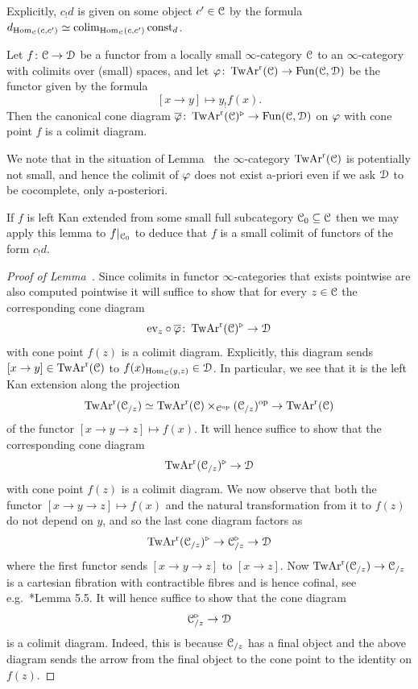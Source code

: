 Explicitly, $c_!d$ is given on some object $c' \in \mathcal C$ by the formula $d_{\operatorname{Hom}_\mathcal C(c,c')} \simeq \mathop{\mathrm{colim}}_{\operatorname{Hom}_\mathcal C(c,c')} \mathrm{const}_d$.

\begin{lemma}
\label{lemma:canonical-colimit}%
Let $f\colon \mathcal C \to \mathcal{D}$ be a functor from a locally small $\infty$-category $\mathcal C$ to an $\infty$-category with colimits over (small) spaces, and let $\varphi\colon \operatorname{TwAr}^{\mathrm{r}}(\mathcal C) \to \operatorname{Fun}(\mathcal C,\mathcal{D})$ be the functor given by the formula 
\[
[x \to y] \mapsto y_!f(x) .
\]
Then the canonical cone diagram $\overline{\varphi}\colon \operatorname{TwAr}^{\mathrm{r}}(\mathcal C)^{\triangleright} \to \operatorname{Fun}(\mathcal C,\mathcal{D})$ on $\varphi$ with cone point $f$ is a colimit diagram.
\end{lemma}

We note that in the situation of Lemma~ the $\infty$-category $\operatorname{TwAr}^{\mathrm{r}}(\mathcal C)$ is potentially not small, and hence the colimit of $\varphi$ does not exist a-priori even if we ask $\mathcal{D}$ to be cocomplete, only a-posteriori. 

\begin{remark}
\label{remark:canonical-colimit}%
If $f$ is left Kan extended from some small full subcategory $\mathcal C_0 \subseteq \mathcal C$ then we may apply this lemma to $f|_{\mathcal C_0}$ to deduce that $f$ is a small colimit of functors of the form $c_!d$.
\end{remark}

\begin{proof}[Proof of Lemma~]
Since colimits in functor $\infty$-categories that exists pointwise are also computed pointwise it will suffice to show that for every $z \in \mathcal C$ the corresponding cone diagram
\[
\mathrm{ev}_{z} \circ \overline{\varphi}\colon \operatorname{TwAr}^{\mathrm{r}}(\mathcal C)^{\triangleright} \to \mathcal{D}
\]
with cone point $f(z)$ is a colimit diagram. Explicitly, this diagram sends $[x \to y] \in \operatorname{TwAr}^{\mathrm{r}}(\mathcal C)$ to $f(x)_{\operatorname{Hom}_{\mathcal C}(y,z)} \in \mathcal{D}$. In particular, we see that it is the left Kan extension along the projection 
\[
\operatorname{TwAr}^{\mathrm{r}}(\mathcal C_{/z}) \simeq \operatorname{TwAr}^{\mathrm{r}}(\mathcal C) \times_{\mathcal C^\mathrm{op}} (\mathcal C_{/z})^\mathrm{op} \to \operatorname{TwAr}^{\mathrm{r}}(\mathcal C)
\]
of the functor $[x \to y \to z] \mapsto f(x)$. It will hence suffice to show that the corresponding cone diagram
\[
\operatorname{TwAr}^{\mathrm{r}}(\mathcal C_{/z})^{\triangleright} \to \mathcal{D}
\]
with cone point $f(z)$ is a colimit diagram. We now observe that both the functor $[x \to y \to z] \mapsto f(x)$ and the natural transformation from it to $f(z)$ do not depend on $y$, and so the last cone diagram factors as
\[
\operatorname{TwAr}^{\mathrm{r}}(\mathcal C_{/z})^{\triangleright} \to \mathcal C_{/z}^{\triangleright} \to \mathcal{D}
\]
where the first functor sends $[x \to y \to z]$ to $[x \to z]$. Now $\operatorname{TwAr}^{\mathrm{r}}(\mathcal C_{/z}) \to \mathcal C_{/z}$ is a cartesian fibration with contractible fibres and is hence cofinal, see e.g.\ \cite{HHLN-two-var-fil}*{Lemma 5.5}. It will hence suffice to show that the cone diagram
\[
\mathcal C_{/z}^{\triangleright} \to \mathcal{D}
\]
is a colimit diagram. Indeed, this is because $\mathcal C_{/z}$ has a final object and the above diagram sends the arrow from the final object to the cone point to the identity on $f(z)$. 
\end{proof}




